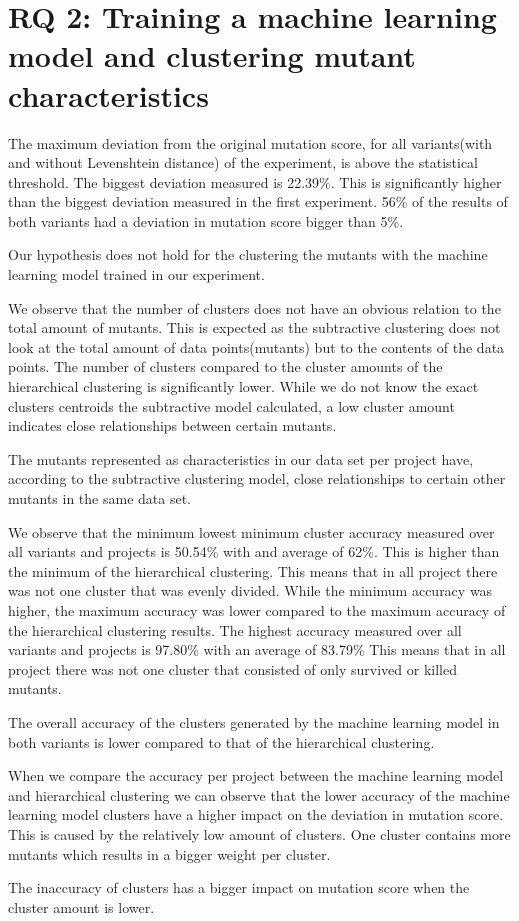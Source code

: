 \documentclass[../main]{subfiles}
\begin{document}
\section{RQ 2: Training a machine learning model and clustering mutant characteristics}
The maximum deviation from the original mutation score, for all variants(with and without Levenshtein distance) of the experiment, is above the statistical threshold.
The biggest deviation measured is 22.39\%.
This is significantly higher than the biggest deviation measured in the first experiment.
56\% of the results of both variants had a deviation in mutation score bigger than 5\%.
\begin{finding}
Our hypothesis does not hold for the clustering the mutants with the machine learning model trained in our experiment.
\end{finding}
We observe that the number of clusters does not have an obvious relation to the total amount of mutants. 
This is expected as the subtractive clustering does not look at the total amount of data points(mutants) but to the contents of the data points.
The number of clusters compared to the cluster amounts of the hierarchical clustering is significantly lower.
While we do not know the exact clusters centroids the subtractive model calculated, a low cluster amount indicates close relationships between certain mutants.
\begin{finding}
The mutants represented as characteristics in our data set per project have, according to the subtractive clustering model, close relationships to certain other mutants in the same data set.
\end{finding}
We observe that the minimum lowest minimum cluster accuracy measured over all variants and projects is 50.54\% with and average of 62\%. 
This is higher than the minimum of the hierarchical clustering.
This means that in all project there was not one cluster that was evenly divided.
While the minimum accuracy was higher, the maximum accuracy was lower compared to the maximum accuracy of the hierarchical clustering results.
The highest accuracy measured over all variants and projects is 97.80\% with an average of 83.79\%
This means that in all project there was not one cluster that consisted of only survived or killed mutants.
\begin{finding}
The overall accuracy of the clusters generated by the machine learning model in both variants is lower compared to that of the hierarchical clustering.
\end{finding}
When we compare the accuracy per project between the machine learning model and hierarchical clustering we can observe that the lower accuracy of the machine learning model clusters have a higher impact on the deviation in mutation score.
This is caused by the relatively low amount of clusters.
One cluster contains more mutants which results in a bigger weight per cluster.
\begin{finding}
The inaccuracy of clusters has a bigger impact on mutation score when the cluster amount is lower.
\end{finding}
\end{document}
